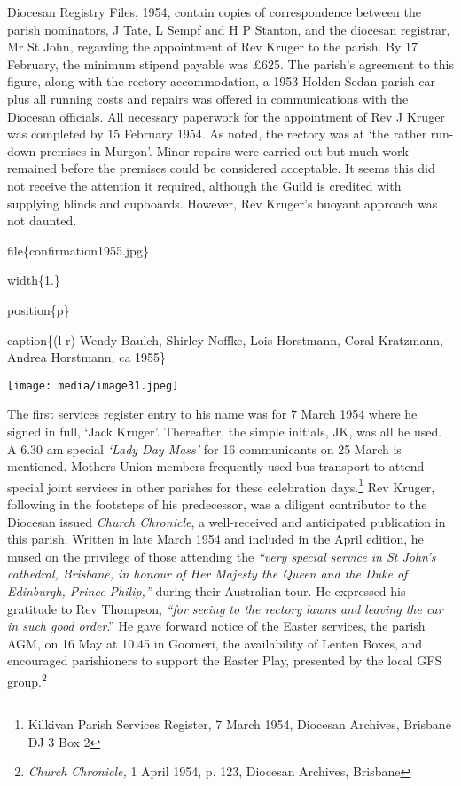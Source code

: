 Diocesan Registry Files, 1954, contain copies of correspondence between the parish nominators, J Tate, L Sempf and H P Stanton, and the diocesan registrar, Mr St John, regarding the appointment of Rev Kruger to the parish. By 17 February, the minimum stipend payable was £625. The parish's agreement to this figure, along with the rectory accommodation, a 1953 Holden Sedan parish car plus all running costs and repairs was offered in communications with the Diocesan officials. All necessary paperwork for the appointment of Rev J Kruger was completed by 15 February 1954. As noted, the rectory was at `the rather run-down premises in Murgon'. Minor repairs were carried out but much work remained before the premises could be considered acceptable. It seems this did not receive the attention it required, although the Guild is credited with supplying blinds and cupboards. However, Rev Kruger's buoyant approach was not daunted.

file\{confirmation1955.jpg\}

width\{1.\}

position\{p\}

caption\{(l-r) Wendy Baulch, Shirley Noffke, Lois Horstmann, Coral Kratzmann, Andrea Horstmann, ca 1955\}

\texttt{[image: media/image31.jpeg]}

The first services register entry to his name was for 7 March 1954 where he signed in full, `Jack Kruger'. Thereafter, the simple initials, JK, was all he used. A 6.30 am special \emph{`Lady Day Mass'} for 16 communicants on 25 March is mentioned. Mothers Union members frequently used bus transport to attend special joint services in other parishes for these celebration days.\footnote{Kilkivan Parish Services Register, 7 March 1954, Diocesan Archives, Brisbane DJ 3 Box 2} Rev Kruger, following in the footsteps of his predecessor, was a diligent contributor to the Diocesan issued \emph{Church Chronicle}, a well-received and anticipated publication in this parish. Written in late March 1954 and included in the April edition, he mused on the privilege of those attending the \emph{``very special service in St John's cathedral, Brisbane, in honour of Her Majesty the Queen and the Duke of Edinburgh, Prince Philip,''} during their Australian tour. He expressed his gratitude to Rev Thompson, \emph{``for seeing to the rectory lawns and leaving the car in such good order}.'' He gave forward notice of the Easter services, the parish AGM, on 16 May at 10.45 in Goomeri, the availability of Lenten Boxes, and encouraged parishioners to support the Easter Play, presented by the local GFS group.\footnote{\emph{Church Chronicle,} 1 April 1954, p. 123, Diocesan Archives, Brisbane}

